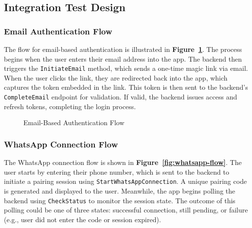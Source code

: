 \subsection*{Integration Test Design}

\subsubsection*{Email Authentication Flow}

The flow for email-based authentication is illustrated in \textbf{Figure~\ref{fig:email-auth-flow}}. The process begins when the user enters their email address into the app. The backend then triggers the \texttt{InitiateEmail} method, which sends a one-time magic link via email. When the user clicks the link, they are redirected back into the app, which captures the token embedded in the link. This token is then sent to the backend's \texttt{CompleteEmail} endpoint for validation. If valid, the backend issues access and refresh tokens, completing the login process.

\begin{figure}[h!]
    \centering
    \caption{Email-Based Authentication Flow}
    \label{fig:email-auth-flow}
\end{figure}    

\subsubsection*{WhatsApp Connection Flow}

The WhatsApp connection flow is shown in \textbf{Figure~\ref{fig:whatsapp-flow}}. The user starts by entering their phone number, which is sent to the backend to initiate a pairing session using \texttt{StartWhatsAppConnection}. A unique pairing code is generated and displayed to the user. Meanwhile, the app begins polling the backend using \texttt{CheckStatus} to monitor the session state. The outcome of this polling could be one of three states: successful connection, still pending, or failure (e.g., user did not enter the code or session expired).

